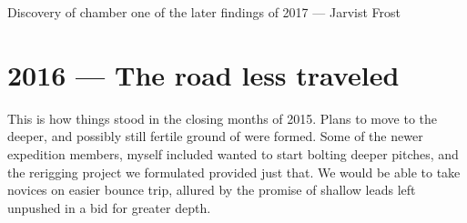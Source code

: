 	\begin{marginfigure}
	\checkoddpage \ifoddpage \forcerectofloat \else \forceversofloat \fi
	\centering
  	\caption{Discovery of \protect{} chamber one of the later findings of 2017 --- Jarvist Frost}
	\end{marginfigure}

\section{2016 --- The road less traveled}
This is how things stood in the closing months of 2015. Plans to move to the deeper, and possibly still fertile ground of  were formed. Some of the newer expedition members, myself included wanted to start bolting deeper pitches, and the rerigging project we formulated provided just that. We would be able to take novices on easier bounce trip, allured by the promise of shallow leads left unpushed in a bid for greater depth.

